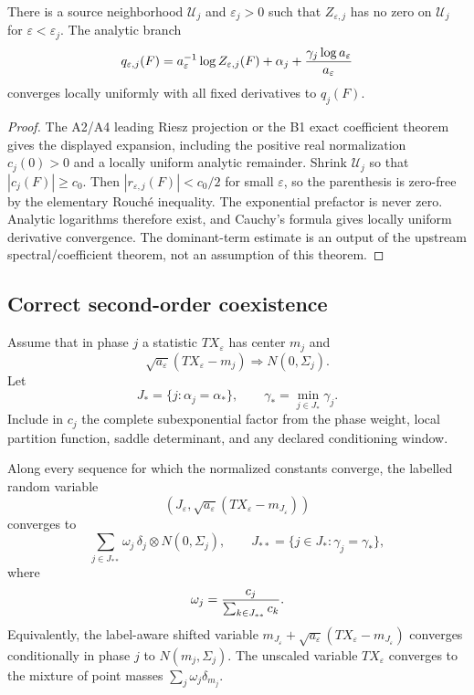 \begin{theorem}
\label{thm:r21-d1-zero}
There is a source neighborhood $\mathcal U_j$ and $\varepsilon_j>0$ such that
$Z_{\varepsilon,j}$ has no zero on $\mathcal U_j$ for
$\varepsilon<\varepsilon_j$.  The analytic branch
\[
 q_{\varepsilon,j}(F)=a_\varepsilon^{-1}\log
 Z_{\varepsilon,j}(F)+\alpha_j+
 {\gamma_j\log a_\varepsilon\over a_\varepsilon}
\]
converges locally uniformly with all fixed derivatives to $q_j(F)$.
\end{theorem}

\begin{proof}
The A2/A4 leading Riesz projection or the B1 exact coefficient theorem gives
the displayed expansion, including the positive real normalization
$c_j(0)>0$ and a locally uniform analytic remainder.  Shrink $\mathcal U_j$
so that $|c_j(F)|\ge c_0$.  Then
$|r_{\varepsilon,j}(F)|<c_0/2$ for small $\varepsilon$, so the parenthesis is
zero-free by the elementary Rouch\'e inequality.  The exponential prefactor is
never zero.  Analytic logarithms therefore exist, and Cauchy's formula gives
locally uniform derivative convergence.  The dominant-term estimate is an
output of the upstream spectral/coefficient theorem, not an assumption of
this theorem.
\end{proof}

\subsection{Correct second-order coexistence}

Assume that in phase $j$ a statistic $T X_\varepsilon$ has center $m_j$ and
\[
 \sqrt{a_\varepsilon}
 (T X_\varepsilon-m_j)
 \Longrightarrow N(0,\Sigma_j).
\]
Let
\[
 J_*=\{j:\alpha_j=\alpha_*\},
 \qquad
 \gamma_*=\min_{j\in J_*}\gamma_j.
\]
Include in $c_j$ the complete subexponential factor from the phase weight,
local partition function, saddle determinant, and any declared conditioning
window.

\begin{theorem}
\label{thm:r21-d1-gaussian}
Along every sequence for which the normalized constants converge, the labelled
random variable
\[
 \left(J_\varepsilon,
 \sqrt{a_\varepsilon}(TX_\varepsilon-m_{J_\varepsilon})\right)
\]
converges to
\[
 \sum_{j\in J_{**}}\omega_j\,
 \delta_j\otimes N(0,\Sigma_j),
 \qquad
 J_{**}=\{j\in J_*:\gamma_j=\gamma_*\},
\]
where
\[
 \omega_j={c_j\over\sum_{k\in J_{**}}c_k}.
\]
Equivalently, the label-aware shifted variable
$m_{J_\varepsilon}+\sqrt{a_\varepsilon}(TX_\varepsilon-m_{J_\varepsilon})$
converges conditionally in phase $j$ to $N(m_j,\Sigma_j)$.  The unscaled
variable $TX_\varepsilon$ converges to the mixture of point masses
$\sum_j\omega_j\delta_{m_j}$.
\end{theorem}

